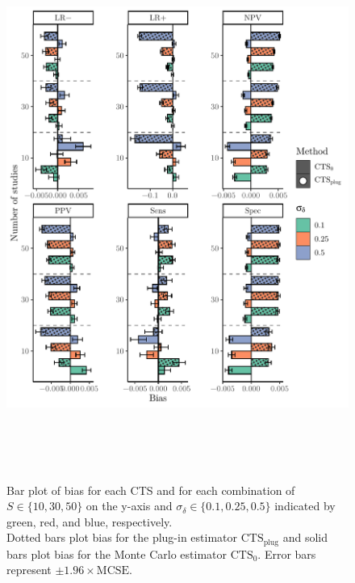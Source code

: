 \documentclass[AMA,STIX1COL]{WileyNJD-v2}
\newcommand{\CTSo}{\text{CTS}_0}
\newcommand{\CTSp}{\text{CTS}_{\text{plug}}}
\begin{document}
\restoregeometry


\begin{figure}
\includegraphics[height = 7in, width = 6in]{bias_plot.pdf}
\caption{Bar plot of bias for each CTS and for each combination of $S \in \{10, 30, 50\}$ on the y-axis and $\sigma_{\delta} \in \{0.1, 0.25, 0.5\}$ indicated by green, red, and blue, respectively. \\
Dotted bars plot bias for the plug-in estimator $\CTSp$ and solid bars plot bias for the Monte Carlo estimator $\CTSo$. Error bars represent $\pm 1.96 \times \text{MCSE}$.}
\label{fig:cts_bias}
\end{figure}
\end{document}
